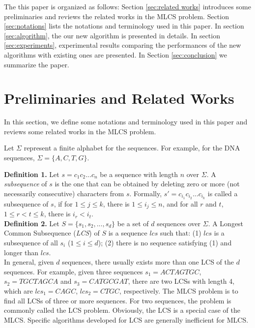 \documentclass{article}
\begin{document}
The this paper is organized as follows: Section \ref{sec:related
  works} introduces some preliminaries and reviews the related works
in the MLCS problem. Section \ref{sec:notations} lists the notations
and terminology used in this paper. In section \ref{sec:algorithm},
the our new algorithm is presented in details. In section
\ref{sec:experiments}, experimental results comparing the performances
of the new algorithms with existing ones are presented. In Section
\ref{sec:conclusion} we summarize the paper.

\section{Preliminaries and Related Works}
\label{sec:related works}

In this section, we define some notations and terminology used in this
paper and reviews some related works in the MLCS problem.

Let $\Sigma$ represent a finite alphabet for the sequences.  For
example, for the DNA sequences, $\Sigma=\{A, C, T, G\}$.

\textbf{Definition 1.} Let $s=c_1c_2...c_n$ be a sequence with length
$n$ over $\Sigma$. A \emph{subsequence} of $s$ is the one that can be
obtained by deleting zero or more (not necessarily consecutive)
characters from $s$. Formally, $s'=c_{i_1}c_{i_2}...c_{i_k}$ is called
a subsequence of $s$, if for $1 \leq j \leq k$, there is
$1 \leq i_j \leq n$, and for all $r$ and $t$, $1 \leq r < t \leq k$,
there is $i_r < i_t$.\\

\textbf{Definition 2.} Let $S=\{s_1, s_2, ..., s_d\}$ be a set of $d$
sequences over $\Sigma$. A Longest Common Subsequence (\emph{LCS}) of
$S$ is a sequence $lcs$ such that: (1) $lcs$ is a subsequence of all
$s_i$ ($1 \leq i \leq d$); (2) there is no sequence satisfying (1) and
longer than $lcs$.\\

In general, given $d$ sequences, there usually exists more than one
LCS of the $d$ sequences. For example, given three sequences $s_1 =
ACTAGTGC$, $s_2 = TGCTAGCA$ and $s_3 = CATGCGAT$, there are two LCSs
with length 4, which are $lcs_1 = CAGC$, $lcs_2 = CTGC$,
respectively. The MLCS problem is to find all LCSs of three or more
sequences. For two sequences, the problem is commonly called the LCS
problem. Obviously, the LCS is a special case of the MLCS. Specific
algorithms developed for LCS are generally inefficient for MLCS.\\
\end{document}
